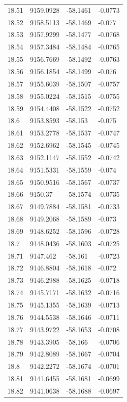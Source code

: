 \begin{table}[H]
\begin{tabular}{llll}
18.51 & 9159.0928 & -58.1461 & -0.0773 \\
18.52 & 9158.5113 & -58.1469 & -0.077 \\
18.53 & 9157.9299 & -58.1477 & -0.0768 \\
18.54 & 9157.3484 & -58.1484 & -0.0765 \\
18.55 & 9156.7669 & -58.1492 & -0.0763 \\
18.56 & 9156.1854 & -58.1499 & -0.076 \\
18.57 & 9155.6039 & -58.1507 & -0.0757 \\
18.58 & 9155.0224 & -58.1515 & -0.0755 \\
18.59 & 9154.4408 & -58.1522 & -0.0752 \\
18.6 & 9153.8593 & -58.153 & -0.075 \\
18.61 & 9153.2778 & -58.1537 & -0.0747 \\
18.62 & 9152.6962 & -58.1545 & -0.0745 \\
18.63 & 9152.1147 & -58.1552 & -0.0742 \\
18.64 & 9151.5331 & -58.1559 & -0.074 \\
18.65 & 9150.9516 & -58.1567 & -0.0737 \\
18.66 & 9150.37 & -58.1574 & -0.0735 \\
18.67 & 9149.7884 & -58.1581 & -0.0733 \\
18.68 & 9149.2068 & -58.1589 & -0.073 \\
18.69 & 9148.6252 & -58.1596 & -0.0728 \\
18.7 & 9148.0436 & -58.1603 & -0.0725 \\
18.71 & 9147.462 & -58.161 & -0.0723 \\
18.72 & 9146.8804 & -58.1618 & -0.072 \\
18.73 & 9146.2988 & -58.1625 & -0.0718 \\
18.74 & 9145.7171 & -58.1632 & -0.0716 \\
18.75 & 9145.1355 & -58.1639 & -0.0713 \\
18.76 & 9144.5538 & -58.1646 & -0.0711 \\
18.77 & 9143.9722 & -58.1653 & -0.0708 \\
18.78 & 9143.3905 & -58.166 & -0.0706 \\
18.79 & 9142.8089 & -58.1667 & -0.0704 \\
18.8 & 9142.2272 & -58.1674 & -0.0701 \\
18.81 & 9141.6455 & -58.1681 & -0.0699 \\
18.82 & 9141.0638 & -58.1688 & -0.0697 \\

\end{tabular}
\end{table}
